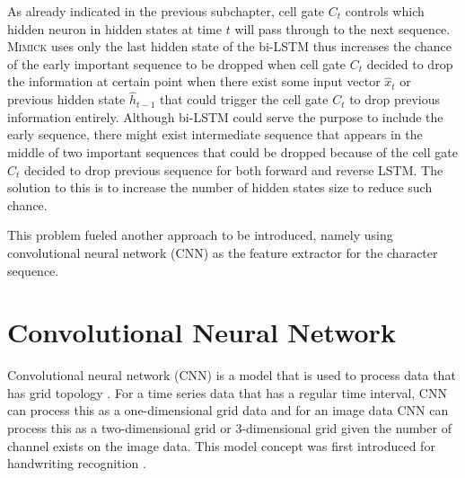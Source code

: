     As already indicated in the previous subchapter, cell gate $C_t$
    controls which hidden neuron in hidden states at time $t$ will
    pass through to the next sequence. \textsc{Mimick} uses only the
    last hidden state of the bi-LSTM thus increases the chance of the
    early important sequence to be dropped when cell gate $C_t$
    decided to drop the information at certain point when there exist
    some input vector $\hat{x}_t$ or previous hidden state $\hat{h}_{t-1}$ that
    could trigger the cell gate $C_t$ to drop previous information
    entirely. Although bi-LSTM could serve the purpose to include the
    early sequence, there might exist intermediate sequence that
    appears in the middle of two important sequences that could be
    dropped because of the cell gate $C_t$ decided to drop previous
    sequence for both forward and reverse LSTM. The solution to this
    is to increase the number of hidden states size to reduce such
    chance. 
    
    This problem fueled another approach to be introduced, namely
    using convolutional neural network (CNN) as the feature extractor
    for the character sequence. 

\section{Convolutional Neural Network}
    Convolutional neural network (CNN) is a model that is used to
    process data that has grid topology \citep{Goodfellow-et-al-2016}.
    For a time series data that has a regular time interval, CNN can
    process this as a one-dimensional grid data and for an image data
    CNN can process this as a two-dimensional grid or 3-dimensional
    grid given the number of channel exists on the image data. This
    model concept was first introduced for handwriting recognition
    \citep{generalization1989lecun}.

